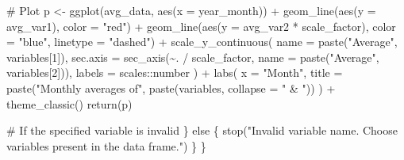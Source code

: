 \documentclass[
  letterpaper,
  DIV=11,
  numbers=noendperiod]{scrartcl}
\newenvironment{Shaded}{\begin{snugshade}}{\end{snugshade}}
\newcommand{\AttributeTok}[1]{\textcolor[rgb]{0.40,0.45,0.13}{#1}}
\newcommand{\CommentTok}[1]{\textcolor[rgb]{0.37,0.37,0.37}{#1}}
\newcommand{\ControlFlowTok}[1]{\textcolor[rgb]{0.00,0.23,0.31}{#1}}
\newcommand{\DecValTok}[1]{\textcolor[rgb]{0.68,0.00,0.00}{#1}}
\newcommand{\FunctionTok}[1]{\textcolor[rgb]{0.28,0.35,0.67}{#1}}
\newcommand{\NormalTok}[1]{\textcolor[rgb]{0.00,0.23,0.31}{#1}}
\newcommand{\OtherTok}[1]{\textcolor[rgb]{0.00,0.23,0.31}{#1}}
\newcommand{\SpecialCharTok}[1]{\textcolor[rgb]{0.37,0.37,0.37}{#1}}
\newcommand{\StringTok}[1]{\textcolor[rgb]{0.13,0.47,0.30}{#1}}
\begin{document}
\begin{Shaded}
\begin{Highlighting}[]
    \CommentTok{\# Plot}
\NormalTok{    p }\OtherTok{\textless{}{-}} \FunctionTok{ggplot}\NormalTok{(avg\_data, }\FunctionTok{aes}\NormalTok{(}\AttributeTok{x =}\NormalTok{ year\_month)) }\SpecialCharTok{+}
      \FunctionTok{geom\_line}\NormalTok{(}\FunctionTok{aes}\NormalTok{(}\AttributeTok{y =}\NormalTok{ avg\_var1), }\AttributeTok{color =} \StringTok{"red"}\NormalTok{) }\SpecialCharTok{+}
      \FunctionTok{geom\_line}\NormalTok{(}\FunctionTok{aes}\NormalTok{(}\AttributeTok{y =}\NormalTok{ avg\_var2 }\SpecialCharTok{*}\NormalTok{ scale\_factor), }\AttributeTok{color =} \StringTok{"blue"}\NormalTok{, }\AttributeTok{linetype =} \StringTok{"dashed"}\NormalTok{) }\SpecialCharTok{+}
      \FunctionTok{scale\_y\_continuous}\NormalTok{(}
        \AttributeTok{name =} \FunctionTok{paste}\NormalTok{(}\StringTok{"Average"}\NormalTok{, variables[}\DecValTok{1}\NormalTok{]),}
        \AttributeTok{sec.axis =} \FunctionTok{sec\_axis}\NormalTok{(}\SpecialCharTok{\textasciitilde{}}\NormalTok{. }\SpecialCharTok{/}\NormalTok{ scale\_factor, }\AttributeTok{name =} \FunctionTok{paste}\NormalTok{(}\StringTok{"Average"}\NormalTok{, variables[}\DecValTok{2}\NormalTok{])),}
        \AttributeTok{labels =}\NormalTok{ scales}\SpecialCharTok{::}\NormalTok{number}
\NormalTok{      ) }\SpecialCharTok{+}
      \FunctionTok{labs}\NormalTok{(}
        \AttributeTok{x =} \StringTok{"Month"}\NormalTok{,}
        \AttributeTok{title =} \FunctionTok{paste}\NormalTok{(}\StringTok{"Monthly averages of"}\NormalTok{, }\FunctionTok{paste}\NormalTok{(variables, }\AttributeTok{collapse =} \StringTok{" \& "}\NormalTok{))}
\NormalTok{      ) }\SpecialCharTok{+}
      \FunctionTok{theme\_classic}\NormalTok{()}
    \FunctionTok{return}\NormalTok{(p)}
    
  \CommentTok{\# If the specified variable is invalid  }
\NormalTok{  \} }\ControlFlowTok{else}\NormalTok{ \{}
    \FunctionTok{stop}\NormalTok{(}\StringTok{"Invalid variable name. Choose variables present in the data frame."}\NormalTok{)}
\NormalTok{  \}}
\NormalTok{\}}
\end{Highlighting}
\end{Shaded}
\end{document}

